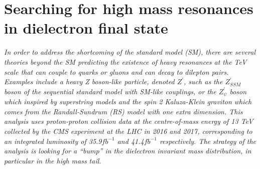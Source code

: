 \chapter{Searching for high mass resonances in dielectron final state}\label{chap:Zprime}
\textit{In order to address the shortcoming of the standard model (SM), there are several theories beyond the SM predicting the existence of heavy resonances at the TeV scale that can couple to quarks or gluons and can decay to dilepton pairs. Examples include a heavy Z boson-like particle, denoted $Z^{'}$, such as the $Z^{'}_{SSM}$ boson of the sequential standard model with SM-like couplings, or the $Z^{'}_{\psi}$ boson which inspired by superstring models and the spin 2 Kaluza-Klein graviton which comes from the Randall-Sundrum (RS) model with one extra dimension. This analysis uses proton-proton collision data at the centre-of-mass energy of 13 TeV collected by the CMS experiment at the LHC in 2016 and 2017, corresponding to an integrated luminosity of 35.9$fb^{-1}$ and 41.4$fb^{-1}$ respectively. The strategy of the analysis is looking for a ``bump'' in the dielectron invariant mass distribution, in particular in the high mass tail.}
























